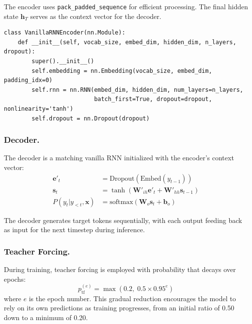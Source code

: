 \documentclass[runningheads]{llncs}
\begin{document}
The encoder uses \texttt{pack\_padded\_sequence} for efficient processing. The final hidden state $\mathbf{h}_T$ serves as the context vector for the decoder.

\begin{lstlisting}[caption={Encoder architecture (vanilla RNN).},label=lst:encoder]
class VanillaRNNEncoder(nn.Module):
    def __init__(self, vocab_size, embed_dim, hidden_dim, n_layers, dropout):
        super().__init__()
        self.embedding = nn.Embedding(vocab_size, embed_dim, padding_idx=0)
        self.rnn = nn.RNN(embed_dim, hidden_dim, num_layers=n_layers,
                          batch_first=True, dropout=dropout, nonlinearity='tanh')
        self.dropout = nn.Dropout(dropout)
\end{lstlisting}

\subsubsection{Decoder.}
The decoder is a matching vanilla RNN initialized with the encoder's context vector:
\begin{align}
\mathbf{e}'_t &= \text{Dropout}(\text{Embed}(y_{t-1})) \\
\mathbf{s}_t &= \tanh(\mathbf{W}'_{ih}\mathbf{e}'_t + \mathbf{W}'_{hh}\mathbf{s}_{t-1}) \\
P(y_t | y_{<t}, \mathbf{x}) &= \text{softmax}(\mathbf{W}_o \mathbf{s}_t + \mathbf{b}_o)
\end{align}

The decoder generates target tokens sequentially, with each output feeding back as input for the next timestep during inference.

\subsubsection{Teacher Forcing.}
During training, teacher forcing is employed with probability that decays over epochs:
\begin{equation}
p_{\text{tf}}^{(e)} = \max(0.2, \; 0.5 \times 0.95^e)
\end{equation}
where $e$ is the epoch number. This gradual reduction encourages the model to rely on its own predictions as training progresses, from an initial ratio of 0.50 down to a minimum of 0.20.
\end{document}
